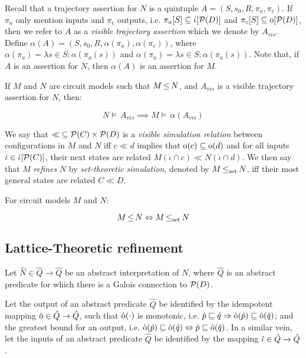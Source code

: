 Recall that a trajectory assertion for $N$ is a quintuple $A = (S,s_{0},R,\pi_{a},\pi_{c})$. If $\pi_{a}$ only mention inputs and $\pi_{c}$ outputs, i.e. $\pi_{a}[S] \subseteq \operatorname{\dot{\iota}}[\mathcal{P}(D)]$ and $\pi_{c}[S] \subseteq \operatorname{\mathrm{o}}[\mathcal{P}(D)]$, then we refer to $A$ as a \textit{visible trajectory assertion} which we denote by $A_{vis}$. Define $\alpha(A) = (S, s_{0}, R, \alpha(\pi_{a}), \alpha(\pi_{c}))$, where $\alpha(\pi_{a}) = \lambda s \in S : \alpha(\pi_{a}(s))$ and $\alpha(\pi_{a}) = \lambda s \in S : \alpha(\pi_{a}(s))$. Note that, if $A$ is an assertion for $N$, then $\alpha(A)$ is an assertion for $M$.

\begin{theorem} \label{thm:refinement-set}
If $M$ and $N$ are circuit models such that $M \operatorname{\leq} N$, and $A_{vis}$ is a visible trajectory assertion for $N$, then:

\begin{equation*}
N \models \, A_{vis} \implies M \models \, \alpha(A_{vis})
\end{equation*}
\end{theorem}

We say that $\ll \: \subseteq \mathcal{P}(C) \times \mathcal{P}(D)$ is a \textit{visible simulation relation} between configurations in $M$ and $N$ iff $c \ll d$ implies that $\operatorname{\mathrm{o}}(c) \subseteq \operatorname{\mathrm{o}}(d)$ and for all inputs $\dot \iota \in \operatorname{\dot{\iota}}[\mathcal{P}(C)]$, their next states are related $M(\dot \iota \cap c) \ll N(\dot \iota \cap d)$. We then say that $M$ \textit{refines} $N$ by \textit{set-theoretic simulation}, denoted by $M \operatorname{\operatorname{\leq}_{\textrm{set}}} N$, iff their most general states are related $C \ll D$.

\begin{theorem} \label{thm:refinement-set-impl}
For circuit models $M$ and $N$:

\begin{equation*}
M \operatorname{\leq} N \Leftrightarrow M \operatorname{\operatorname{\leq}_{\textrm{set}}} N
\end{equation*}
\end{theorem}

\subsection{Lattice-Theoretic refinement}

Let $\hat N \in \hat Q \rightarrow \hat Q$ be an abstract interpretation of $N$, where $\hat Q$ is an abstract predicate for which there is a Galois connection to $\mathcal{P}(D)$.

Let the output of an abstract predicate $\hat Q$ be identified by the idempotent mapping $\operatorname{\hat{\mathrm{o}}} \in \hat Q \rightarrow \hat Q$, such that $\operatorname{\hat{\mathrm{o}}}(\cdot)$ is monotonic, i.e. $\hat p \sqsubseteq \hat q \Rightarrow \operatorname{\hat{\mathrm{o}}}(\hat p) \sqsubseteq \operatorname{\hat{\mathrm{o}}}(\hat q)$; and the greatest bound for an output, i.e. $\operatorname{\hat{\mathrm{o}}}(\hat p) \sqsubseteq \operatorname{\hat{\mathrm{o}}}(\hat q) \Leftrightarrow \hat p \sqsubseteq \operatorname{\hat{\mathrm{o}}}(\hat q)$. In a similar vein, let the inputs of an abstract predicate $\hat Q$ be identified by the mapping $\operatorname{\hat{\iota}} \in \hat Q \rightarrow \hat Q$.

